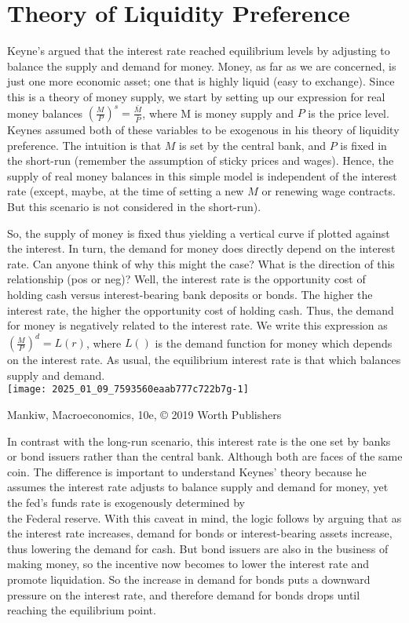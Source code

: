 \documentclass[10pt]{article}
\begin{document}
\section*{Theory of Liquidity Preference}
Keyne's argued that the interest rate reached equilibrium levels by adjusting to balance the supply and demand for money. Money, as far as we are concerned, is just one more economic asset; one that is highly liquid (easy to exchange). Since this is a theory of money supply, we start by setting up our expression for real money balances $\left(\frac{M}{P}\right)^{s}=\frac{\bar{M}}{\bar{P}}$, where M is money supply and $P$ is the price level. Keynes assumed both of these variables to be exogenous in his theory of liquidity preference. The intuition is that $M$ is set by the central bank, and $P$ is fixed in the short-run (remember the assumption of sticky prices and wages). Hence, the supply of real money balances in this simple model is independent of the interest rate (except, maybe, at the time of setting a new $M$ or renewing wage contracts. But this scenario is not considered in the short-run).

So, the supply of money is fixed thus yielding a vertical curve if plotted against the interest. In turn, the demand for money does directly depend on the interest rate. Can anyone think of why this might the case? What is the direction of this relationship (pos or neg)? Well, the interest rate is the opportunity cost of holding cash versus interest-bearing bank deposits or bonds. The higher the interest rate, the higher the opportunity cost of holding cash. Thus, the demand for money is negatively related to the interest rate. We write this expression as $\left(\frac{M}{P}\right)^{d}=L(r)$, where $L()$ is the demand function for money which depends on the interest rate. As usual, the equilibrium interest rate is that which balances supply and demand.\\
\texttt{[image: 2025\_01\_09\_7593560eaab777c722b7g-1]}

Mankiw, Macroeconomics, 10e, © 2019 Worth Publishers

In contrast with the long-run scenario, this interest rate is the one set by banks or bond issuers rather than the central bank. Although both are faces of the same coin. The difference is important to understand Keynes' theory because he assumes the interest rate adjusts to balance supply and demand for money, yet the fed's funds rate is exogenously determined by\\
the Federal reserve. With this caveat in mind, the logic follows by arguing that as the interest rate increases, demand for bonds or interest-bearing assets increase, thus lowering the demand for cash. But bond issuers are also in the business of making money, so the incentive now becomes to lower the interest rate and promote liquidation. So the increase in demand for bonds puts a downward pressure on the interest rate, and therefore demand for bonds drops until reaching the equilibrium point.
\end{document}
